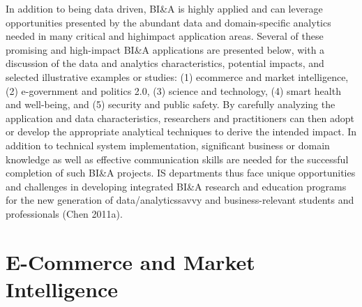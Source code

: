 In addition to being data driven, BI\&A is highly applied and
can leverage opportunities presented by the abundant data and
domain-specific analytics needed in many critical and highimpact
application areas. Several of these promising and
high-impact BI\&A applications are presented below, with a
discussion of the data and analytics characteristics, potential
impacts, and selected illustrative examples or studies: (1) ecommerce
and market intelligence, (2) e-government and
politics 2.0, (3) science and technology, (4) smart health and
well-being, and (5) security and public safety. By carefully
analyzing the application and data characteristics, researchers
and practitioners can then adopt or develop the appropriate
analytical techniques to derive the intended impact. In addition
to technical system implementation, significant business
or domain knowledge as well as effective communication
skills are needed for the successful completion of such BI\&A
projects. IS departments thus face unique opportunities and
challenges in developing integrated BI\&A research and
education programs for the new generation of data/analyticssavvy
and business-relevant students and professionals (Chen
2011a).

\section*{E-Commerce and Market Intelligence}

